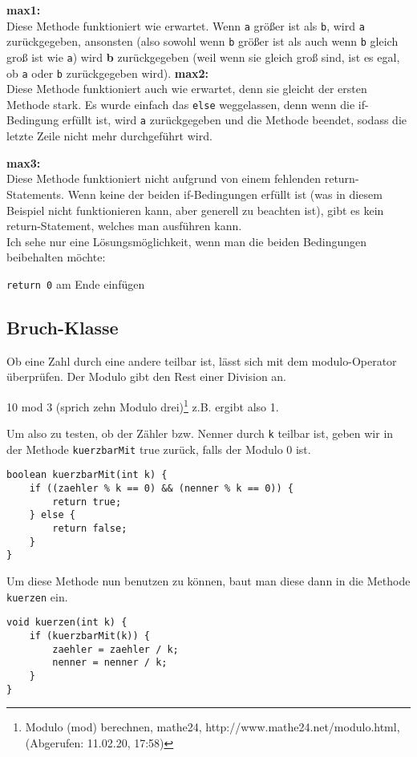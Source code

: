 \documentclass{scrartcl}   %
\begin{document}
\begin{itemize}
    \barrow \textbf{max1:}\\
    Diese Methode funktioniert wie erwartet. Wenn \texttt{a} größer ist als \texttt{b}, wird \texttt{a} zurückgegeben, ansonsten (also sowohl wenn \texttt{b} größer ist als auch wenn \texttt{b} gleich groß ist wie \texttt{a}) wird \textbf{b} zurückgegeben (weil wenn sie gleich groß sind, ist es egal, ob \texttt{a} oder \texttt{b} zurückgegeben wird).
    \barrow \textbf{max2:}\\
    Diese Methode funktioniert auch wie erwartet, denn sie gleicht der ersten Methode stark. Es wurde einfach das \texttt{else} weggelassen, denn wenn die if-Bedingung erfüllt ist, wird \texttt{a} zurückgegeben und die Methode beendet, sodass die letzte Zeile nicht mehr durchgeführt wird.
    
    \newpage
    
    \barrow \textbf{max3:}\\
    Diese Methode funktioniert nicht aufgrund von einem fehlenden return-Statements. Wenn keine der beiden if-Bedingungen erfüllt ist (was in diesem Beispiel nicht funktionieren kann, aber generell zu beachten ist), gibt es kein return-Statement, welches man ausführen kann.\\
    Ich sehe nur eine Lösungsmöglichkeit, wenn man die beiden Bedingungen beibehalten möchte:
    
    \texttt{return 0} am Ende einfügen
\end{itemize}

\subsection{Bruch-Klasse}

Ob eine Zahl durch eine andere teilbar ist, lässt sich mit dem modulo-Operator überprüfen. Der Modulo gibt den Rest einer Division an.

10 mod 3 (sprich \glqq zehn Modulo drei\grqq{})\footnote{Modulo (mod) berechnen, mathe24, http://www.mathe24.net/modulo.html, (Abgerufen: 11.02.20, 17:58)} z.B. ergibt also 1.

Um also zu testen, ob der Zähler bzw. Nenner durch \texttt{k} teilbar ist, geben wir in der Methode \texttt{kuerzbarMit} true zurück, falls der Modulo 0 ist.

\begin{lstlisting}
boolean kuerzbarMit(int k) {
    if ((zaehler % k == 0) && (nenner % k == 0)) {
        return true;
    } else {
        return false;
    }
}
\end{lstlisting}

\newpage

Um diese Methode nun benutzen zu können, baut man diese dann in die Methode \texttt{kuerzen} ein.

\begin{lstlisting}
void kuerzen(int k) {
    if (kuerzbarMit(k)) {
        zaehler = zaehler / k;
        nenner = nenner / k;
    }
}
\end{lstlisting}
\end{document}
